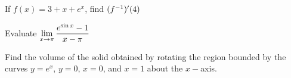 \documentclass[notes]{subfiles}
\begin{document}
		\begin{ex}
			If $f(x) = 3 + x + e^x$, find $(f^{-1})'(4)$
		\end{ex}
			
		\begin{ex}
			Evaluate $\displaystyle \lim_{x\to \pi} \dfrac{e^{\sin x} - 1}{x-\pi}$
		\end{ex}
			
		\begin{ex}
			Find the volume of the solid obtained by rotating the region bounded by the curves $y = e^x$, $y = 0$, $x = 0$, and $x = 1$ about the $x-$axis.
		\end{ex}
				
\clearpage
\end{document}
